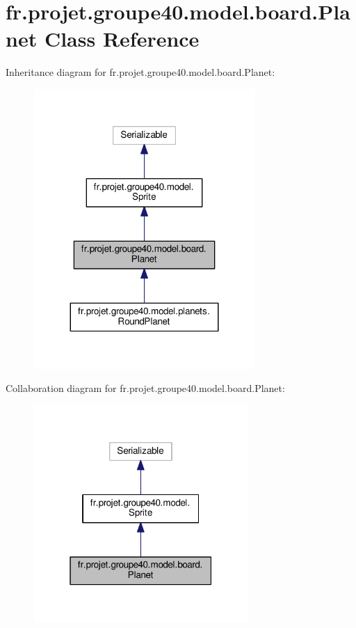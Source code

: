 \hypertarget{classfr_1_1projet_1_1groupe40_1_1model_1_1board_1_1_planet}{}\section{fr.\+projet.\+groupe40.\+model.\+board.\+Planet Class Reference}
\label{classfr_1_1projet_1_1groupe40_1_1model_1_1board_1_1_planet}


Inheritance diagram for fr.\+projet.\+groupe40.\+model.\+board.\+Planet\+:\nopagebreak
\begin{figure}[H]
\begin{center}
\leavevmode
\includegraphics[width=239pt]{classfr_1_1projet_1_1groupe40_1_1model_1_1board_1_1_planet__inherit__graph}
\end{center}
\end{figure}


Collaboration diagram for fr.\+projet.\+groupe40.\+model.\+board.\+Planet\+:\nopagebreak
\begin{figure}[H]
\begin{center}
\leavevmode
\includegraphics[width=232pt]{classfr_1_1projet_1_1groupe40_1_1model_1_1board_1_1_planet__coll__graph}
\end{center}
\end{figure}

